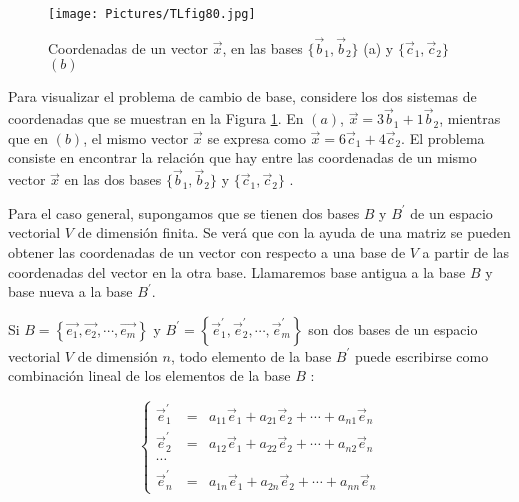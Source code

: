 \begin{figure}
    \centering
    \texttt{[image: Pictures/TLfig80.jpg]}
    \caption{Coordenadas de un vector $\vec x$, en las bases $\{\vec b_1,\vec b_2\}$ (a) y $\{\vec c_1,\vec c_2\}$ $(b)$}
    \label{TLfig700}
\end{figure}


Para visualizar el problema de cambio de base, considere los dos  sistemas de  coordenadas que se muestran en
la Figura \ref{TLfig700}.  En $(a)$, $\vec{x} = 3\vec{b}_1 +1 \vec{b}_2$, mientras que en $(b)$, el mismo vector $\vec{x}$ se
expresa como $\vec{x} = 6\vec{c}_1 +4 \vec{c}_2$. 
El problema consiste en encontrar la relación que hay entre las coordenadas de un mismo vector $\vec{x}$ en las dos bases  $  \{\vec{b}_1,\vec{b}_2 \}$  y $  \{\vec{c}_1,\vec{c}_2 \}$ .



Para el caso general, supongamos que se tienen dos bases  $B$ y $B ^{\prime}$ de un espacio vectorial $V$ de dimensión finita. Se verá que con la ayuda de una matriz se pueden obtener las coordenadas de un vector con respecto a una base de $V$ a partir de las coordenadas del vector en la  otra base. Llamaremos base antigua a la base $B$ y base nueva a la base $B ^{\prime}$.


Si $B =\left\{\vec{e_1},\vec{ e_2},\cdots, \vec{e_m}\right\}$ y $B ^{\prime}=\left\{\vec{e}^{\prime}_1,\vec{e} ^{\prime}_2,\cdots, \vec{e} ^{\prime}_m\right\}$ son dos bases de un espacio vectorial $V$ de dimensión $n$,
todo elemento de la base  $B ^{\prime}$   puede escribirse como combinación lineal de los elementos de la base $B$ :

\begin{equation} \label{matriz Acb}
\left\{ \begin{array} {ccl} 
                    \vec{e }^{\prime}_1&\ =&   a_{11}\vec{e}_1+a_{21}\vec{e}_2+\cdots +a_{n1}\vec{e}_n    \\
                     \vec{e }^{\prime}_2 &\ = &a_{12}\vec{e}_1+a_{22}\vec{e}_2+\cdots +a_{n2}\vec{e}_n  \\
										\cdots  \\
                    \vec{e }^{\prime}_n &\ =&a_{1n}\vec{e}_1+a_{2n}\vec{e}_2+\cdots +a_{nn}\vec{e}_n
                   \end{array}
           \right.
\end{equation}


